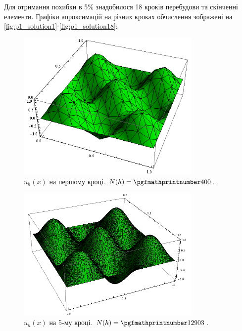 Для отримання похибки в 5\% знадобилося 18 кроків перебудови та  скінченні елементи. Графіки апроксимацій на різних кроках обчислення зображені на \autoref{fig:p1_solution1}-\ref{fig:p1_solution18}:
%
\begin{figure}[H]
	\centering
    \includegraphics[width=0.8\textwidth]{problem1/my/solutions/1}
    \caption{$u_h(x)$ на першому кроці. $N(h) = \nn{400}$.}
    \label{fig:p1_solution1}
\end{figure}
%
\begin{figure}[H]
	\centering
    \includegraphics[width=0.8\textwidth]{problem1/my/solutions/5}
    \caption{$u_h(x)$ на 5-му кроці. $N(h) = \nn{12903}$.}
    \label{fig:p1_solution5}
\end{figure}
%
